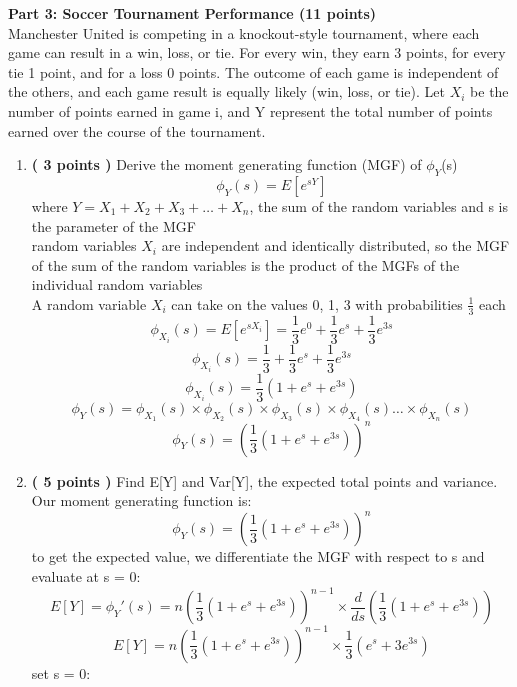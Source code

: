 \documentclass[a3paper,12pt]{extarticle} %
\begin{document}
    \subitem\textbf{Part 3: Soccer Tournament Performance (11 points)}
    \\ Manchester United is competing in a knockout-style tournament, where each game can result in a win,
    loss, or tie. For every win, they earn 3 points, for every tie 1 point, and for a loss 0 points. The outcome
    of each game is independent of the others, and each game result is equally likely (win, loss, or tie). Let
    \(X_i\) be the number of points earned in game i, and Y represent the total number of points earned over
    the course of the tournament.
    \begin{enumerate}
        \item \textbf{( 3 points )} Derive the moment generating function (MGF) of \(\phi_Y\)(s)
        \[
        \phi_{Y}(s) = E[e^{sY}]
        \]
        where \(Y = X_1 + X_2 + X_3 + \dots + X_n\), the sum of the random variables and s is the parameter of the MGF
        \\ random variables \(X_i\) are independent and identically distributed, so the MGF of the sum of the random variables is the product of the MGFs of the individual random variables
        \\ A random variable \(X_i\) can take on the values 0, 1, 3 with probabilities \(\frac{1}{3}\) each 
        \[
        \phi_{X_i}(s) = E[e^{sX_i}] = \frac{1}{3}e^{0} + \frac{1}{3}e^{s} + \frac{1}{3}e^{3s}
        \]
        \[
        \phi_{X_i}(s) = \frac{1}{3} + \frac{1}{3}e^{s} + \frac{1}{3}e^{3s}
        \]
        \[
        \phi_{X_i}(s) = \frac{1}{3}(1 + e^{s} + e^{3s})
        \]
        \[
        \phi_{Y}(s) = \phi_{X_1}(s) \times \phi_{X_2}(s) \times \phi_{X_3}(s) \times \phi_{X_4}(s) \dots \times \phi_{X_n}(s)
        \]
        \[
        \phi_{Y}(s) = \left(\frac{1}{3}(1 + e^{s} + e^{3s})\right)^n
        \]
        \item \textbf{( 5 points )} Find E[Y] and Var[Y], the expected total points and variance.
        \\ Our moment generating function is:
        \[
        \phi_{Y}(s) = \left(\frac{1}{3}(1 + e^{s} + e^{3s})\right)^n
        \]
        to get the expected value, we differentiate the MGF with respect to s and evaluate at s = 0:
        \[
        E[Y] = \phi_{Y}'(s) = n\left(\frac{1}{3}(1 + e^{s} + e^{3s})\right)^{n-1} \times \frac{d}{ds}\left(\frac{1}{3}(1 + e^{s} + e^{3s})\right)
        \]
        \[
        E[Y] = n\left(\frac{1}{3}(1 + e^{s} + e^{3s})\right)^{n-1} \times \frac{1}{3}(e^{s} + 3e^{3s})
        \]
        set s = 0:
        \[
\]
\end{enumerate}
\end{document}

